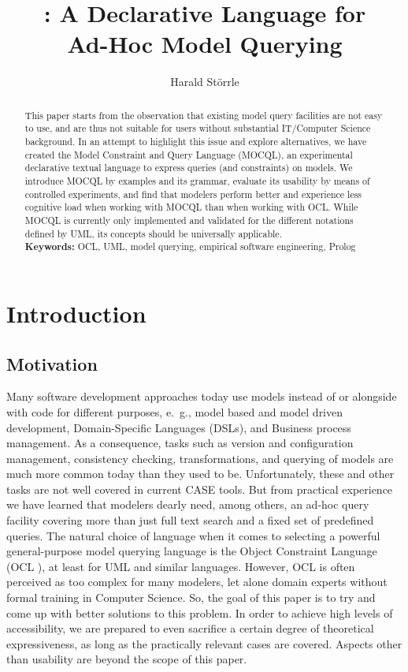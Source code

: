 \documentclass{llncs}
\title{\MMQ: A Declarative Language for\\Ad-Hoc Model Querying}
\author{Harald St\"orrle}
\institute{Institute of Applied Mathematics and Computer Science\\Technical University of Denmark\\ \texttt{hsto@dtu.dk}}
\newcommand{\MMQ}{MOCQL\xspace}
\begin{document}
\thispagestyle{empty}\maketitle

\begin{abstract} 
This paper starts from the observation that existing model query facilities are not easy to use, and are thus not suitable for users without substantial IT/Computer Science background. In an attempt to highlight this issue and explore alternatives, we have created the Model Constraint and Query Language (\MMQ), an experimental declarative textual language to express queries (and constraints) on models. We introduce \MMQ by examples and its grammar, evaluate its usability by means of controlled experiments, and find that modelers perform better and experience less cognitive load when working with \MMQ than when working with OCL. While \MMQ is currently only implemented and validated for the different notations defined by UML, its concepts should be universally applicable.\\
\textbf{Keywords:} OCL, UML, model querying, empirical software engineering, Prolog
\end{abstract}


\section{Introduction}

\subsection{Motivation}

Many software development approaches today use models instead of or alongside with code for different purposes, e.\ g., model based and model driven development, Domain-Specific Languages (DSLs), and Business process management. As a consequence, tasks such as version and configuration management, consistency checking, transformations, and querying of models are much more common today than they used to be. Unfortunately, these and other tasks are not well covered in current CASE tools. But from practical experience we have learned that modelers dearly need, among others, an ad-hoc query facility covering more than just full text search and a fixed set of predefined queries. The natural choice of language when it comes to selecting a powerful general-purpose model querying language is the Object Constraint Language (OCL \cite{ocl231}), at least for UML and similar languages. However, OCL is often perceived as too complex for many modelers, let alone domain experts without formal training in Computer Science. So, the goal of this paper is to try and come up with better solutions to this problem. In order to achieve high levels of accessibility, we are prepared to even sacrifice a certain degree of theoretical expressiveness, as long as the practically relevant cases are covered. Aspects other than usability are beyond the scope of this paper.
\end{document}
